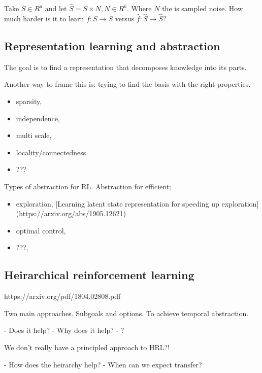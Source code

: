 Take \(S \in R^d\) and let \(\hat S = S \times N, N \in R^k\). Where
\(N\) the is sampled noise. How much harder is it to learn
\(f: S \to S\) versus \(\hat f: \hat S \to \hat S\)?

\cite{Wang2019a,Kaiser2019}

\hypertarget{representation-learning-and-abstraction}{%
\subsection{Representation learning and abstraction}\label{representation-learning-and-abstraction}}

The goal is to find a representation that decomposes knowledge into its
parts.

Another way to frame this is: trying to find the basis with the right
properties.

\begin{itemize}
\tightlist
\item
  sparsity,
\item
  independence,
\item
  multi scale,
\item
  locality/connectedness
\item
  ???
\end{itemize}


Types of abstraction for RL. Abstraction for efficient;

\begin{itemize}
\tightlist
\item
  exploration, [Learning latent state representation for speeding up exploration](https://arxiv.org/abs/1905.12621)
\item
  optimal control,
\item
  ???,
\end{itemize}


\subsection{Heirarchical reinforcement learning}


https://arxiv.org/pdf/1804.02808.pdf

Two main approaches. Subgoals and options. To achieve temporal abstraction.

- Does it help?
- Why does it help?
- ?

We don't really have a principled approach to HRL?!

- How does the heirarchy help?
- When can we expect transfer?


